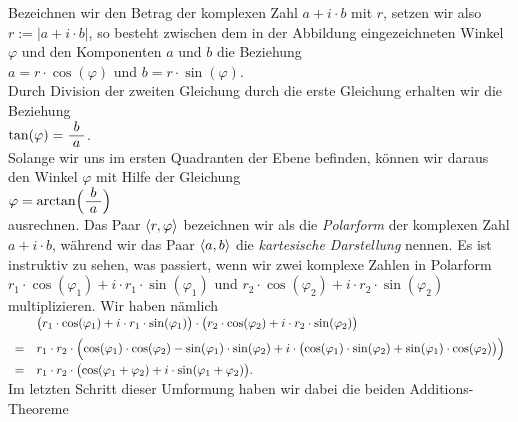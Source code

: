 \vspace*{0.2cm}
\noindent
Bezeichnen wir den Betrag der komplexen Zahl $a + i \cdot b$ mit $r$, setzen wir also 
$r := |a + i \cdot b|$, so besteht zwischen dem in der Abbildung eingezeichneten Winkel $\varphi$
und den Komponenten $a$ und 
$b$ die Beziehung
\\[0.2cm]
\hspace*{1.3cm} $a = r \cdot \cos(\varphi)$ \quad und \quad $b = r \cdot \sin(\varphi)$.
\\[0.2cm]
Durch Division der zweiten Gleichung durch die erste Gleichung erhalten wir die Beziehung
\\[0.2cm]
\hspace*{1.3cm} $\tan(\varphi) = \bruch{b}{a}$.
\\[0.2cm]
Solange wir uns im ersten Quadranten der Ebene befinden, können wir daraus den Winkel $\varphi$ mit Hilfe
der Gleichung
\\[0.2cm]
\hspace*{1.3cm} $\varphi = \arctan\Bigl(\bruch{b}{a}\Bigr)$
\\[0.2cm]
ausrechnen.  Das Paar $\pair(r, \varphi)$ bezeichnen wir als die \emph{Polarform} der
komplexen Zahl $a + i \cdot b$, während wir das Paar $\pair(a,b)$ die \emph{kartesische Darstellung}
nennen.  Es ist instruktiv zu sehen, was passiert, wenn wir zwei
komplexe Zahlen in Polarform
\\[0.2cm]
\hspace*{1.3cm} 
$r_1 \cdot \cos(\varphi_1) + i \cdot r_1 \cdot \sin(\varphi_1)$ \quad und \quad
$r_2 \cdot \cos(\varphi_2) + i \cdot r_2 \cdot \sin(\varphi_2)$ 
\\[0.2cm]
multiplizieren.  Wir haben nämlich
\\[0.2cm]
$
\begin{array}[t]{cl}
  & \bigl(r_1 \cdot \cos(\varphi_1) + i \cdot r_1 \cdot \sin(\varphi_1)\bigr) \cdot
    \bigl(r_2 \cdot \cos(\varphi_2) + i \cdot r_2 \cdot \sin(\varphi_2)\bigr)       \\[0.2cm]
= & r_1 \cdot r_2 \cdot
    \Bigl(\cos(\varphi_1) \cdot \cos(\varphi_2) - \sin(\varphi_1) \cdot \sin(\varphi_2) +
          i \cdot \bigl(\cos(\varphi_1) \cdot \sin(\varphi_2) + \sin(\varphi_1) \cdot \cos(\varphi_2)\bigr)
    \Bigr) \\[0.2cm]
= & r_1 \cdot r_2 \cdot
    \bigl(\cos(\varphi_1 + \varphi_2) + i \cdot \sin(\varphi_1 + \varphi_2) \bigr).
\end{array}
$
\\[0.2cm]
Im letzten Schritt dieser Umformung haben wir dabei die beiden Additions-Theoreme 
